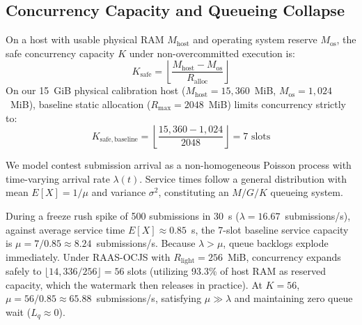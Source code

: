 \documentclass[conference]{IEEEtran}
\begin{document}
\subsection{Concurrency Capacity and Queueing Collapse}
On a host with usable physical RAM $M_{\mathrm{host}}$ and operating system reserve $M_{\mathrm{os}}$, the safe concurrency capacity $K$ under non-overcommitted execution is:
\begin{equation}
K_{\mathrm{safe}} = \left\lfloor \frac{M_{\mathrm{host}} - M_{\mathrm{os}}}{R_{\mathrm{alloc}}} \right\rfloor
\end{equation}
On our 15~GiB physical calibration host ($M_{\mathrm{host}} = 15,360$~MiB, $M_{\mathrm{os}} = 1,024$~MiB), baseline static allocation ($R_{\mathrm{max}} = 2048$~MiB) limits concurrency strictly to:
\begin{equation}
K_{\mathrm{safe, baseline}} = \left\lfloor \frac{15,360 - 1,024}{2048} \right\rfloor = 7 \text{ slots}
\end{equation}

We model contest submission arrival as a non-homogeneous Poisson process with time-varying arrival rate $\lambda(t)$. Service times follow a general distribution with mean $E[X] = 1/\mu$ and variance $\sigma^2$, constituting an $M/G/K$ queueing system.

During a freeze rush spike of 500 submissions in 30~s ($\lambda = 16.67$~submissions/s), against average service time $E[X] \approx 0.85$~s, the 7-slot baseline service capacity is $\mu = 7 / 0.85 \approx 8.24$~submissions/s. Because $\lambda > \mu$, queue backlogs explode immediately. Under RAAS-OCJS with $R_{\mathrm{light}} = 256$~MiB, concurrency expands safely to $\lfloor 14{,}336/256 \rfloor = 56$ slots (utilizing 93.3\% of host RAM as reserved capacity, which the watermark then releases in practice). At $K = 56$, $\mu = 56 / 0.85 \approx 65.88$~submissions/s, satisfying $\mu \gg \lambda$ and maintaining zero queue wait ($L_q \approx 0$).
\end{document}

